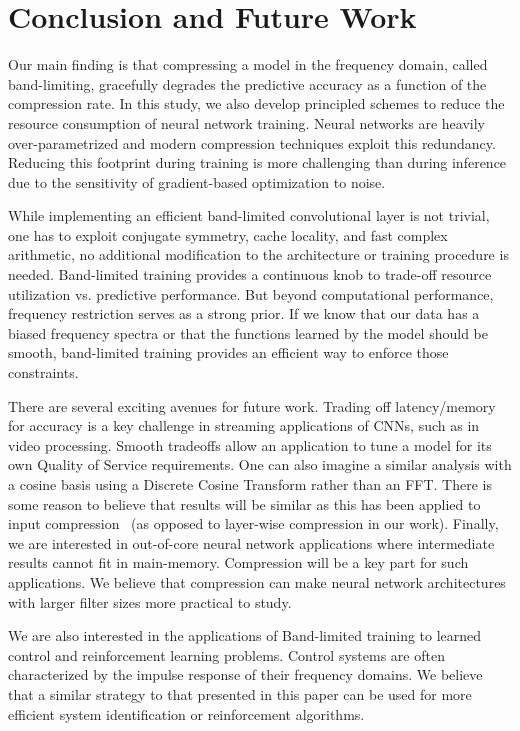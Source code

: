 \section{Conclusion and Future Work}
Our main finding is that compressing a model in the frequency domain, called band-limiting, gracefully degrades the predictive accuracy as a function of the compression rate.
In this study, we also develop principled schemes to reduce the resource consumption of neural network training.
Neural networks are heavily over-parametrized and modern compression techniques exploit this redundancy.
Reducing this footprint during training is more challenging than during inference due to the sensitivity of gradient-based optimization to noise.

While implementing an efficient band-limited convolutional layer is not trivial, one has to exploit conjugate symmetry, cache locality, and fast complex arithmetic, no additional modification to the architecture or training procedure is needed. Band-limited training provides a continuous knob to trade-off resource utilization vs. predictive performance.
But beyond computational performance, frequency restriction serves as a strong prior.
If we know that our data has a biased frequency spectra or that the functions learned by the model should be smooth, band-limited training provides an efficient way to enforce those constraints.

There are several exciting avenues for future work. Trading off latency/memory for accuracy is a key challenge in streaming applications of CNNs, such as in video processing. Smooth tradeoffs allow an application to tune a model for its own Quality of Service requirements. One can also imagine a similar analysis with a cosine basis using a Discrete Cosine Transform rather than an FFT. There is some reason to believe that results will be similar as this has been applied to input compression~\cite{dctUber2018NIPS} (as opposed to layer-wise compression in our work). Finally, we are interested in out-of-core neural network applications where intermediate results cannot fit in main-memory. Compression will be a key part for such applications. We believe that compression can make neural network architectures with larger filter sizes more practical to study.

We are also interested in the applications of Band-limited training to learned control and reinforcement learning problems.
Control systems are often characterized by the impulse response of their frequency domains.
We believe that a similar strategy to that presented in this paper can be used for more efficient system identification or reinforcement algorithms.